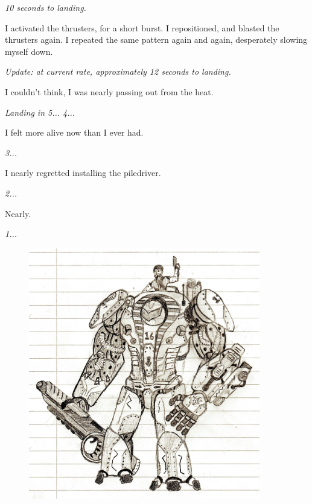 {\it 10 seconds to landing.}

I activated the thrusters, for a short burst. I repositioned, and blasted the thrusters again. I repeated the same pattern again and again, desperately slowing myself down.

{\it Update: at current rate, approximately 12 seconds to landing.}

I couldn't think, I was nearly passing out from the heat.

{\it Landing in 5... 4...}

I felt more alive now than I ever had.

{\it 3...}

I nearly regretted installing the piledriver.

{\it 2...}

Nearly.

{\it 1...}

\vspace{10mm}

\begin{figure}[h!]
\centering
\includegraphics[width=0.9\textwidth]{./pictures/drop}
\end{figure}
